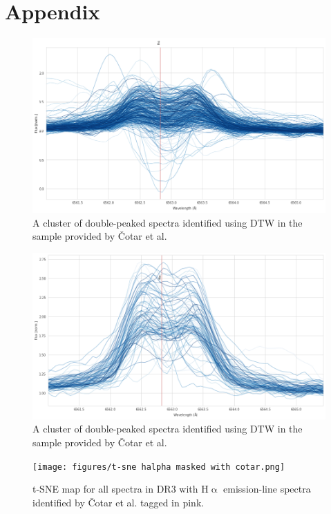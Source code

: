 \chapter{Appendix}

\begin{figure}[!htb]
\centering
\includegraphics[scale=0.42]{figures/cotar_class_4_10.png}
\caption{A cluster of double-peaked spectra identified using DTW in the sample provided by Čotar et al.}
\end{figure}

\begin{figure}[!htb]
\centering
\includegraphics[scale=0.42]{figures/cotar_class_6_10.png}
\caption{A cluster of double-peaked spectra identified using DTW in the sample provided by Čotar et al.}
\end{figure}

\begin{figure}[!htb]
\centering
\texttt{[image: figures/t-sne halpha masked with cotar.png]}
\caption{t-SNE map for all spectra in DR3 with H$\upalpha$ emission-line spectra identified by Čotar et al. tagged in pink.}
\label{fig5.3}
\end{figure}

